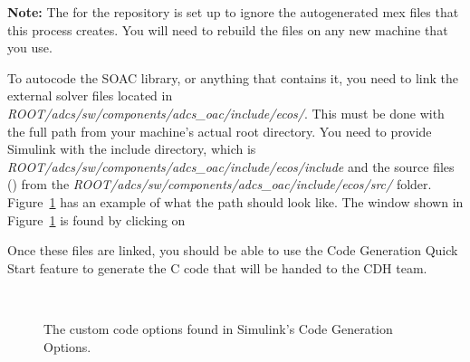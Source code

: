 \documentclass[10pt]{article}
\begin{document}
\textbf{Note:} The  for the repository is set up to ignore the autogenerated mex files that this process creates. You will need to rebuild the files on any new machine that you use.

To autocode the SOAC library, or anything that contains it, you need to link the external solver files located in \textit{ROOT/adcs/sw/components/adcs\_oac/include/ecos/}. This must be done with the full path from your machine's actual root directory. You need to provide Simulink with the include directory, which is \textit{ROOT/adcs/sw/components/adcs\_oac/include/ecos/include} and the source files () from the \textit{ROOT/adcs/sw/components/adcs\_oac/include/ecos/src/} folder. Figure~\ref{fig:autocode} has an example of what the path should look like. The window shown in Figure~\ref{fig:autocode} is found by clicking on
\begin{center}
\end{center}
Once these files are linked, you should be able to use the Code Generation Quick Start feature to generate the C code that will be handed to the CDH team.

\begin{figure}
\centering
{} \\
\caption{The custom code options found in Simulink's Code Generation Options.}
\label{fig:autocode}
\end{figure}
\end{document}
